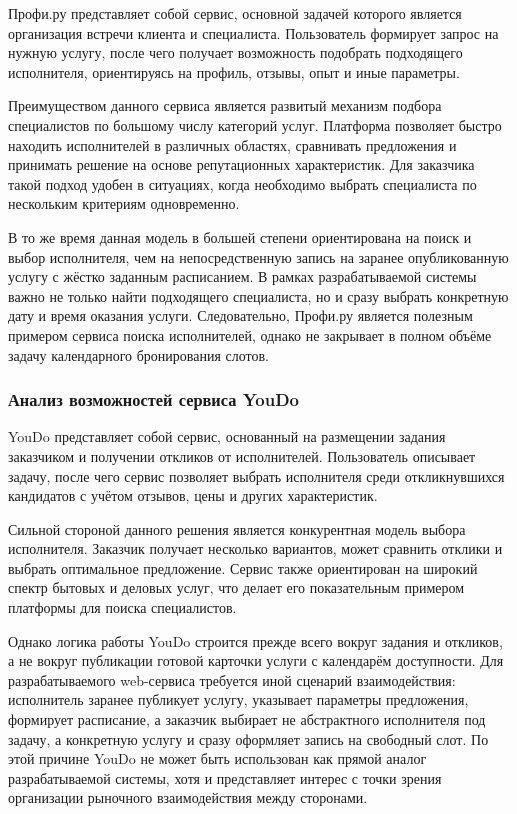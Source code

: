 Профи.ру представляет собой сервис, основной задачей которого является организация встречи клиента и специалиста. Пользователь формирует запрос на нужную услугу, после чего получает возможность подобрать подходящего исполнителя, ориентируясь на профиль, отзывы, опыт и иные параметры.

Преимуществом данного сервиса является развитый механизм подбора специалистов по большому числу категорий услуг. Платформа позволяет быстро находить исполнителей в различных областях, сравнивать предложения и принимать решение на основе репутационных характеристик. Для заказчика такой подход удобен в ситуациях, когда необходимо выбрать специалиста по нескольким критериям одновременно.

В то же время данная модель в большей степени ориентирована на поиск и выбор исполнителя, чем на непосредственную запись на заранее опубликованную услугу с жёстко заданным расписанием. В рамках разрабатываемой системы важно не только найти подходящего специалиста, но и сразу выбрать конкретную дату и время оказания услуги. Следовательно, Профи.ру является полезным примером сервиса поиска исполнителей, однако не закрывает в полном объёме задачу календарного бронирования слотов.

\subsubsection{Анализ возможностей сервиса YouDo}

YouDo представляет собой сервис, основанный на размещении задания заказчиком и получении откликов от исполнителей. Пользователь описывает задачу, после чего сервис позволяет выбрать исполнителя среди откликнувшихся кандидатов с учётом отзывов, цены и других характеристик.

Сильной стороной данного решения является конкурентная модель выбора исполнителя. Заказчик получает несколько вариантов, может сравнить отклики и выбрать оптимальное предложение. Сервис также ориентирован на широкий спектр бытовых и деловых услуг, что делает его показательным примером платформы для поиска специалистов.

Однако логика работы YouDo строится прежде всего вокруг задания и откликов, а не вокруг публикации готовой карточки услуги с календарём доступности. Для разрабатываемого web-сервиса требуется иной сценарий взаимодействия: исполнитель заранее публикует услугу, указывает параметры предложения, формирует расписание, а заказчик выбирает не абстрактного исполнителя под задачу, а конкретную услугу и сразу оформляет запись на свободный слот. По этой причине YouDo не может быть использован как прямой аналог разрабатываемой системы, хотя и представляет интерес с точки зрения организации рыночного взаимодействия между сторонами.

